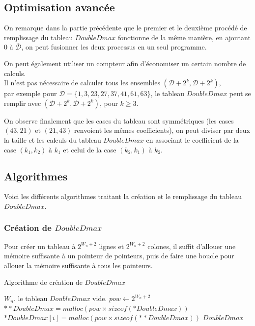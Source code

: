 \documentclass[12pt, a4paper]{memoir}
\newcommand{\dbarre}{\overline{\mathcal{D}}}
\begin{document}
    \subsection{Optimisation avancée}
    
    On remarque dans la partie précédente que le premier et le deuxième procédé de remplissage du tableau $DoubleDmax$
    fonctionne de la même manière, en ajoutant $0$ à $\dbarre$, on peut fusionner les deux processus en un seul programme.
    
    On peut également utiliser un compteur afin d'économiser un certain nombre de calculs. \\
    Il n'est pas nécessaire de calculer tous les ensembles $(\mathcal{D}+2^{k},\mathcal{D}+2^{k})$, \\ 
    par exemple pour $\dbarre = \{1,3,23,27,37,41,61,63\}$, le tableau $DoubleDmax$ peut se remplir avec 
    $(\mathcal{D}+2^{k},\mathcal{D}+2^{k})$, pour $k \geq 3$.
    
    On observe finalement que les cases du tableau sont symmétriques (les cases $(43,21)$ et $(21,43)$ renvoient les mêmes coefficients),    
    on peut diviser par deux la taille et les calculs du tableau $DoubleDmax$ en associant le coefficient
    de la case $(k_1,k_2)$ à $k_1$ et celui de la case $(k_2,k_1)$ à $k_2$.
 
    \subsection{Algorithmes}
    
      Voici les différents algorithmes traitant la création et le remplissage du tableau $DoubleDmax$.
      
      \subsubsection{Création de $DoubleDmax$}

      Pour créer un tableau à $2^{W_n+2}$ lignes et $2^{W_n+2}$ colones, il suffit d'allouer une mémoire suffisante à 
      un pointeur de pointeurs, puis de faire une boucle pour allouer la mémoire suffisante à tous les pointeurs.
      
\begin{algorithm}
 \caption{Algorithme de création de $DoubleDmax$}
 \begin{algorithmic}
  \REQUIRE $W_n$.
  \ENSURE le tableau $DoubleDmax$ vide.
  \STATE $pow \leftarrow 2^{W_n+2}$
  \STATE $**DoubleDmax = malloc(pow \times sizeof(*DoubleDmax))$ 
  \STATE $*DoubleDmax[i] = malloc(pow \times sizeof(**DoubleDmax))$ 
  \ENDFOR
  \RETURN $DoubleDmax$
 \end{algorithmic}
\end{algorithm}    
      
\end{document}
